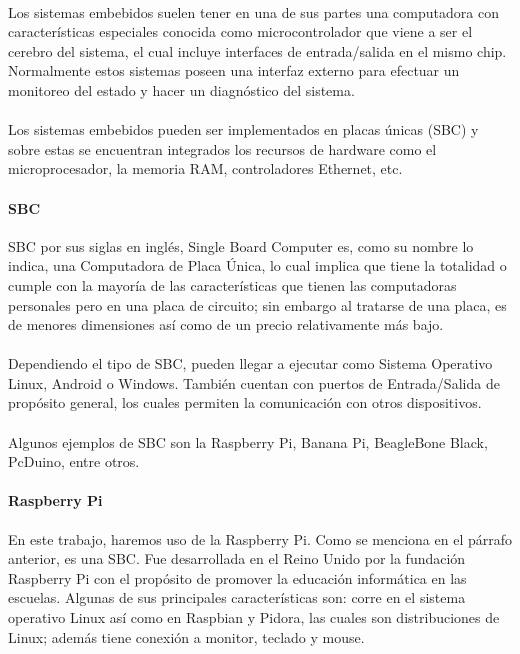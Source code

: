 \paragraph{}
Los sistemas embebidos suelen tener en una de sus partes una computadora con características especiales conocida como microcontrolador que viene a ser el cerebro del sistema, el cual incluye interfaces de entrada/salida en el mismo chip. Normalmente estos sistemas poseen una interfaz externo para efectuar un monitoreo del estado y hacer un diagnóstico del sistema.\citep{MarcoTeorico15}
\paragraph{}
Los sistemas embebidos pueden ser implementados en placas únicas (SBC) y sobre estas se encuentran integrados los recursos de hardware como el microprocesador, la memoria RAM, controladores Ethernet, etc.\citep{MarcoTeorico14}
\paragraph{SBC}
SBC por sus siglas en inglés, Single Board Computer es, como su nombre lo indica, una Computadora de Placa Única, lo cual implica que tiene la totalidad o cumple con la mayoría de las características que tienen las computadoras personales pero en una placa de circuito; sin embargo al tratarse de una placa, es de menores dimensiones así como de un precio relativamente más bajo.
\paragraph{}
Dependiendo el tipo de SBC, pueden llegar a ejecutar como Sistema Operativo Linux, Android o Windows. También cuentan con puertos de Entrada/Salida de propósito general, los cuales permiten la comunicación con otros dispositivos.\citep{MarcoTeorico18}  
\paragraph{}
Algunos ejemplos de SBC son la Raspberry Pi, Banana Pi, BeagleBone Black, PcDuino, entre otros.
\paragraph{Raspberry Pi}
En este trabajo, haremos uso de la Raspberry Pi. Como se menciona en el párrafo anterior, es una SBC. Fue desarrollada en el Reino Unido por la fundación Raspberry Pi con el propósito de promover la educación informática en las escuelas. Algunas de sus principales características son: corre en el sistema operativo Linux así como en Raspbian y Pidora, las cuales son distribuciones de Linux; además tiene conexión a monitor, teclado y mouse.\citep{MarcoTeorico19}   

